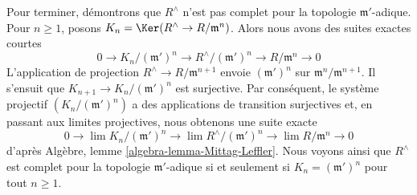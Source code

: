 \medskip\noindent
Pour terminer, démontrons que $R^\wedge$ n'est pas complet pour la topologie $\mathfrak m'$-adique.
Pour $n \geq 1$, posons $K_n = \Ker(R^\wedge \to R/\mathfrak m^n)$. Alors
nous avons des suites exactes courtes
$$
0 \to K_n/(\mathfrak m')^n \to R^\wedge/(\mathfrak m')^n \to
R/\mathfrak m^n \to 0
$$
L'application de projection $R^\wedge \to R/\mathfrak m^{n + 1}$ envoie
$(\mathfrak m')^n$ sur $\mathfrak m^n/\mathfrak m^{n + 1}$.
Il s'ensuit que $K_{n + 1} \to K_n/(\mathfrak m')^n$ est surjective.
Par conséquent, le système projectif $\left(K_n/(\mathfrak m')^n\right)$
a des applications de transition surjectives et,
en passant aux limites projectives, nous obtenons une suite exacte
$$
0 \to \lim K_n/(\mathfrak m')^n \to
\lim R^\wedge/(\mathfrak m')^n \to
\lim R/\mathfrak m^n \to 0
$$
d'après Algèbre, lemme \ref{algebra-lemma-Mittag-Leffler}.
Nous voyons ainsi que $R^\wedge$ est complet pour la topologie $\mathfrak m'$-adique
si et seulement si $K_n = (\mathfrak m')^n$ pour tout $n \geq 1$.

